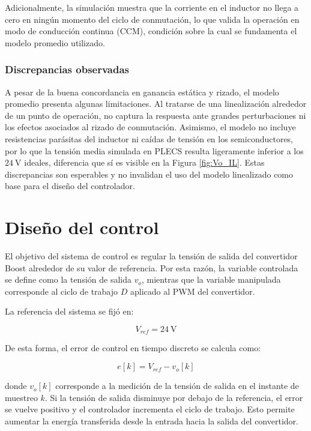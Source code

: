 \documentclass[conference]{IEEEtran}
\begin{document}
Adicionalmente, la simulación muestra que la corriente en el inductor no llega
a cero en ningún momento del ciclo de conmutación, lo que valida la operación
en modo de conducción continua (CCM), condición sobre la cual se fundamenta
el modelo promedio utilizado.

\subsubsection{Discrepancias observadas}

A pesar de la buena concordancia en ganancia estática y rizado, el modelo promedio
presenta algunas limitaciones. Al tratarse de una linealización alrededor de un
punto de operación, no captura la respuesta ante grandes perturbaciones ni los
efectos asociados al rizado de conmutación. Asimismo, el modelo no incluye
resistencias parásitas del inductor ni caídas de tensión en los semiconductores,
por lo que la tensión media simulada en PLECS resulta ligeramente inferior a los
$24~\mathrm{V}$ ideales, diferencia que sí es visible en la Figura \ref{fig:Vo_IL}.
Estas discrepancias son esperables y no invalidan el uso del modelo linealizado
como base para el diseño del controlador.






\section{Diseño del control}

El objetivo del sistema de control es regular la tensión de salida del convertidor Boost alrededor de su valor de referencia. Por esta razón, la variable controlada se define como la tensión de salida $v_o$, mientras que la variable manipulada corresponde al ciclo de trabajo $D$ aplicado al PWM del convertidor.

La referencia del sistema se fijó en:

\begin{equation}
    V_{ref}=24~\mathrm{V}
\end{equation}

De esta forma, el error de control en tiempo discreto se calcula como:

\begin{equation}
    e[k]=V_{ref}-v_o[k]
\end{equation}

donde $v_o[k]$ corresponde a la medición de la tensión de salida en el instante de muestreo $k$. Si la tensión de salida disminuye por debajo de la referencia, el error se vuelve positivo y el controlador incrementa el ciclo de trabajo. Esto permite aumentar la energía transferida desde la entrada hacia la salida del convertidor.
\end{document}
